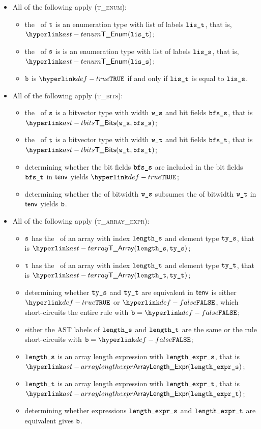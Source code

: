 \begin{itemize}
\item All of the following apply (\textsc{t\_enum}):
  \begin{itemize}
  \item the \underlyingtype\ of $\texttt{t}$ is an enumeration type with list of labels $\texttt{lis\_t}$, that is, $\TEnum(\vlit)$;
  \item the \underlyingtype\ of $\texttt{s}$ is is an enumeration type with list of labels $\texttt{lis\_s}$, that is, $\TEnum(\vlis)$;
  \item $\texttt{b}$ is $\True$ if and only if $\texttt{lis\_t}$ is equal to $\texttt{lis\_s}$.
  \end{itemize}

\item All of the following apply (\textsc{t\_bits}):
  \begin{itemize}
  \item the \underlyingtype\ of $\texttt{s}$ is a bitvector type with width $\texttt{w\_s}$ and bit fields $\texttt{bfs\_s}$, that is $\TBits(\ws, \bfss)$;
  \item the \underlyingtype\ of $\texttt{t}$ is a bitvector type with width $\texttt{w\_t}$ and bit fields $\texttt{bfs\_t}$, that is $\TBits(\wt, \bfst)$;
  \item determining whether the bit fields $\texttt{bfs\_s}$ are included in the bit fields $\texttt{bfs\_t}$ in $\textsf{tenv}$ yields $\True$\ProseOrTypeError;
  \item determining whether the \symbolicdomain{} of bitwidth $\texttt{w\_s}$ subsumes the \symbolicdomain{} of bitwidth $\texttt{w\_t}$ in $\textsf{tenv}$ yields $\texttt{b}$.
  \end{itemize}

\item All of the following apply (\textsc{t\_array\_expr}):
  \begin{itemize}
  \item $\texttt{s}$ has the \underlyingtype\ of an array with index $\texttt{length\_s}$ and element type $\texttt{ty\_s}$, that is $\TArray(\vlengths, \vtys)$;
  \item $\texttt{t}$ has the \underlyingtype\ of an array with index $\texttt{length\_t}$ and element type $\texttt{ty\_t}$, that is $\TArray(\vlengtht, \vtyt)$;
  \item determining whether $\texttt{ty\_s}$ and $\texttt{ty\_t}$ are equivalent in $\textsf{tenv}$ is either $\True$
  or $\False$, which short-circuits the entire rule with $\vb=\False$;
  \item either the AST labels of $\texttt{length\_s}$ and $\texttt{length\_t}$ are the same or the rule short-circuits with $\vb=\False$;
  \item $\texttt{length\_s}$ is an array length expression with $\texttt{length\_expr\_s}$, that is \\ $\ArrayLengthExpr(\vlengthexprs)$;
  \item $\texttt{length\_t}$ is an array length expression with $\texttt{length\_expr\_t}$, that is \\ $\ArrayLengthExpr(\vlengthexprt)$;
  \item determining whether expressions $\texttt{length\_expr\_s}$ and $\texttt{length\_expr\_t}$ are equivalent gives $\texttt{b}$.
  \end{itemize}


\end{itemize}
